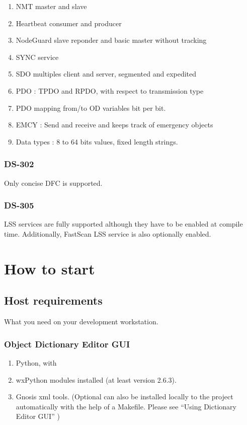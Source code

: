 \documentclass[12pt,english,a4paper]{book}
\begin{document}
\begin{enumerate}
\item NMT master and slave
\item Heartbeat consumer and producer
\item NodeGuard slave reponder and basic master without tracking
\item SYNC service
\item SDO multiples client and server, segmented and expedited
\item PDO : TPDO and RPDO, with respect to transmission type
\item PDO mapping from/to OD variables bit per bit. 
\item EMCY : Send and receive and keeps track of emergency objects
\item Data types : 8 to 64 bits values, fixed length strings.
\end{enumerate}

\subsubsection{DS-302}

Only concise DFC is supported.

\subsubsection{DS-305}

LSS services are fully supported although they have to be enabled at compile time. Additionally, FastScan LSS service is also optionally enabled. 

\section{How to start}

\subsection{Host requirements}

What you need on your development workstation.

\subsubsection{Object Dictionary Editor GUI}

\begin{enumerate}
\item Python, with 
\item wxPython modules installed (at least version 2.6.3).
\item Gnosis xml tools. (Optional can also be installed locally to the project
automatically with the help of a Makefile. Please see {}``Using Dictionary
Editor GUI'' ) 
\end{enumerate}
\end{document}
